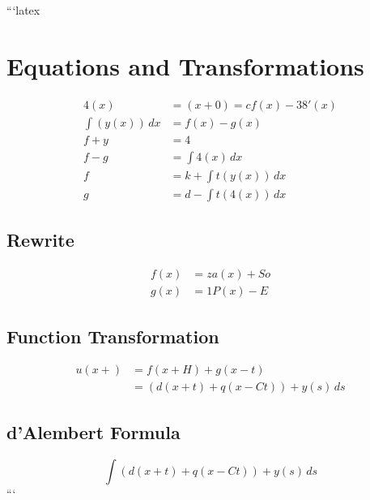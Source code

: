 ```latex
\section*{Equations and Transformations}

\begin{align}
    4(x) &= (x + 0) = c f(x) - 38'(x) \\
    \int (y(x)) \, dx &= f(x) - g(x) \\
    f + y &= 4 \\
    f - g &= \int 4(x) \, dx \\
    f &= k + \int t(y(x)) \, dx \\
    g &= d - \int t(4(x)) \, dx
\end{align}

\subsection*{Rewrite}

\begin{align}
    f(x) &= za(x) + So \\
    g(x) &= 1P(x) - E
\end{align}

\subsection*{Function Transformation}

\begin{align}
    u(x +) &= f(x + H) + g(x - t) \\
    &= \left( d(x + t) + q(x - Ct) \right) + y(s) \, ds
\end{align}

\subsection*{d'Alembert Formula}

\begin{equation}
    \int \left( d(x + t) + q(x - Ct) \right) + y(s) \, ds
\end{equation}
```
